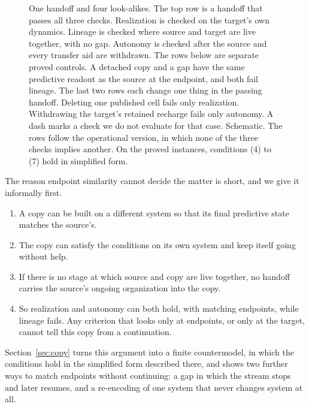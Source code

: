 \begin{figure}[tbp]
\centering

\caption{One handoff and four look-alikes. The top row is a handoff that passes all three checks. Realization is checked on the target's own dynamics. Lineage is checked where source and target are live together, with no gap. Autonomy is checked after the source and every transfer aid are withdrawn. The rows below are separate proved controls. A detached copy and a gap have the same predictive readout as the source at the endpoint, and both fail lineage. The last two rows each change one thing in the passing handoff. Deleting one published cell fails only realization. Withdrawing the target's retained recharge fails only autonomy. A dash marks a check we do not evaluate for that case. Schematic. The rows follow the operational version, in which none of the three checks implies another. On the proved instances, conditions (4) to (7) hold in simplified form.}
\label{fig:three}
\end{figure}

The reason endpoint similarity cannot decide the matter is short, and we give
it informally first.
\begin{enumerate}
\item[(P1)] A copy can be built on a different system so that its final
predictive state matches the source's.
\item[(P2)] The copy can satisfy the conditions on its own system and keep
itself going without help.
\item[(P3)] If there is no stage at which source and copy are live together,
no handoff carries the source's ongoing organization into the copy.
\item[(C)] So realization and autonomy can both hold, with matching
endpoints, while lineage fails. Any criterion that looks only at endpoints, or
only at the target, cannot tell this copy from a continuation.
\end{enumerate}
Section~\ref{sec:copy} turns this argument into a finite countermodel, in which
the conditions hold in the simplified form described there, and
shows two further ways to match endpoints without continuing: a gap in which
the stream stops and later resumes, and a re-encoding of one system that never
changes system at all.

